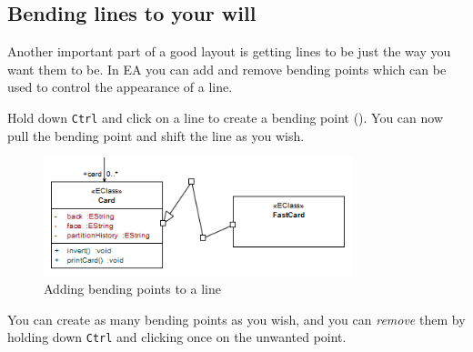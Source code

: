 \newpage

\subsection{Bending lines to your will}

Another important part of a good layout is getting lines to be just the way you want them to be. In EA you can add and remove bending points which can be used
to control the appearance of a line.

\begin{stepbystep}
\item Hold down \texttt{Ctrl} and click on a line to create a bending point (). You can now pull the bending point
and shift the line as you wish.
 
\begin{figure}[htbp]
\begin{center}
  \includegraphics[width=0.8\textwidth]{ea_bendingLines}
  \caption{Adding bending points to a line}   
  \label{ea:bendLines}
\end{center}
\end{figure}

\item You can create as many bending points as you wish, and you can \emph{remove} them by holding down \texttt{Ctrl} and clicking once
on the unwanted point.
\end{stepbystep}
